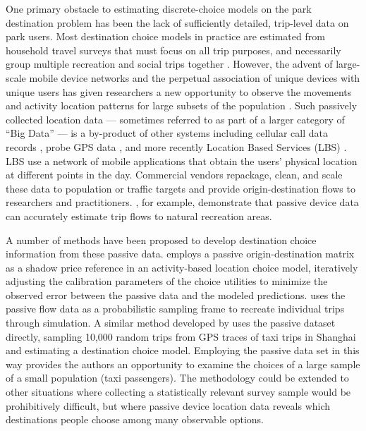\documentclass[3p, authoryear, review, doubleblind]{elsarticle} %
\begin{document}
One primary obstacle to estimating discrete-choice models on the park
destination problem has been the lack of sufficiently detailed, trip-level data
on park users. Most destination choice models in practice are estimated from
household travel surveys that must focus on all trip purposes, and necessarily
group multiple recreation and social trips together \citep{nchrp716}. However, the
advent of large-scale mobile device networks and the perpetual association of
unique devices with unique users has given researchers a new opportunity to
observe the movements and activity location patterns for large subsets of the
population \citep{Naboulsi2016}. Such passively collected location data --- sometimes
referred to as part of a larger category of ``Big Data'' --- is a by-product of other
systems including cellular call data records \citep[e.g.,][]{Bolla2000, Calabrese2011}, probe GPS data \citep{Huang2015}, and more recently Location Based
Services (LBS) \citep{Roll2019, Komanduri2017}. LBS use a network of mobile
applications that obtain the users' physical location at different points in the
day. Commercial vendors repackage, clean, and scale these data to population or
traffic targets and provide origin-destination flows to researchers and
practitioners. \citet{Monz2019}, for example, demonstrate that passive device data can
accurately estimate trip flows to natural recreation areas.

A number of methods have been proposed to develop destination choice
information from these passive data. \citet{Bernardin2018} employs a passive
origin-destination matrix as a shadow price reference in an activity-based
location choice model, iteratively adjusting the calibration parameters of the
choice utilities to minimize the observed error between the passive data and the
modeled predictions. \citet{tf_idea} uses the passive flow data as a probabilistic
sampling frame to recreate individual trips through simulation. A similar method
developed by \citet{Zhu2018} uses the passive dataset directly, sampling 10,000 random
trips from GPS traces of taxi trips in Shanghai and estimating a destination
choice model. Employing the passive data set in this way provides the authors an
opportunity to examine the choices of a large sample of a small population (taxi
passengers). The \citet{Zhu2018} methodology could be extended to other situations
where collecting a statistically relevant survey sample would be prohibitively
difficult, but where passive device location data reveals which destinations
people choose among many observable options.
\end{document}
